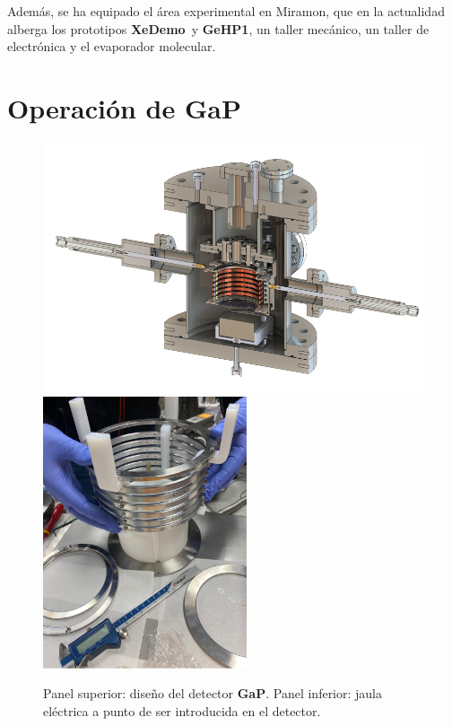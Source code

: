 \documentclass[12pt,a4paper,article]{report} %
\def\xed{{\bf XeDemo}}
\def\ged{{\bf GeHP1}}
\def\gap{{\bf GaP}}
\begin{document}
Además, se ha equipado el área experimental en Miramon,  que en la actualidad alberga los prototipos \xed\ y \ged, un taller mecánico, un taller de electrónica y el evaporador  molecular. 


\section*{Operación de \gap}

\begin{figure}[bht!]
\begin{center}
\includegraphics[width=12cm]{img/gap.png}
\includegraphics[width=6cm]{img/gap-fc.png}
\caption{Panel superior: diseño del detector \gap. Panel inferior: jaula eléctrica a punto de ser introducida en el detector.}
\label{fig:gap}
\end{center}
\end{figure}
\end{document}
